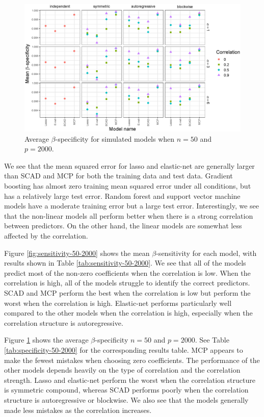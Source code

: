 \documentclass{article}
\begin{document}
\begin{figure}[h!]
	\centering
	\includegraphics[width = \textwidth]{images/facet-specificity/facet_specificity_50_2000.eps}
	\captionsetup{width = 0.8\textwidth}
	\caption{Average $\beta$-specificity for simulated models when $n = 50$ and $p = 2000$.}
	\label{fig:specificity-50-2000}
\end{figure}

We see that the mean squared error for lasso and elastic-net are generally larger than SCAD and MCP for both the training data and test data. Gradient boosting has almost zero training mean squared error under all conditions, but has a relatively large test error. Random forest and support vector machine models have a moderate training error but a large test error. Interestingly, we see that the non-linear models all perform better when there is a strong correlation between predictors. On the other hand, the linear models are somewhat less affected by the correlation.

Figure \ref{fig:sensitivity-50-2000} shows the mean $\beta$-sensitivity for each model, with results shown in Table \ref{tab:sensitivity-50-2000}. We see that all of the models predict most of the non-zero coefficients when the correlation is low. When the correlation is high, all of the models struggle to identify the correct predictors. SCAD and MCP perform the best when the correlation is low but perform the worst when the correlation is high. Elastic-net performs particularly well compared to the other models when the correlation is high, especially when the correlation structure is autoregressive.

Figure \ref{fig:specificity-50-2000} shows the average $\beta$-specificity $n = 50$ and $p = 2000$. See Table \ref{tab:specificity-50-2000} for the corresponding results table. MCP appears to make the fewest mistakes when choosing zero coefficients. The performance of the other models depends heavily on the type of correlation and the correlation strength. Lasso and elastic-net perform the worst when the correlation structure is symmetric compound, whereas SCAD performs poorly when the correlation structure is autoregressive or blockwise. We also see that the models generally made less mistakes as the correlation increases.
\end{document}
